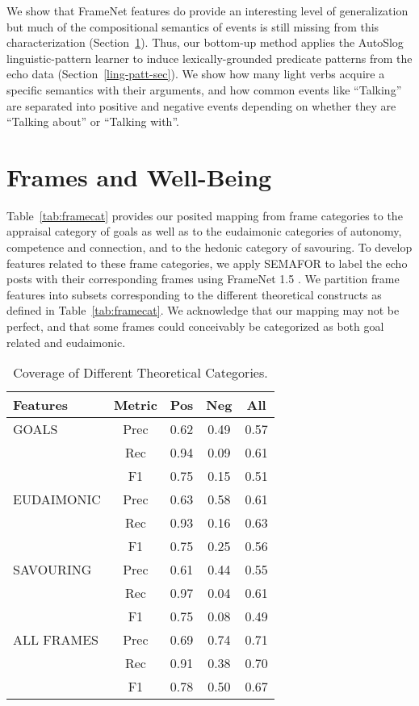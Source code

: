 \documentclass[11pt,letterpaper]{article}
\begin{document}
We show that FrameNet features do provide an interesting level of
generalization but much of the compositional semantics of events is
still missing from this characterization (Section~\ref{frame-sec}).  Thus, our bottom-up method
applies the AutoSlog linguistic-pattern learner to induce
lexically-grounded predicate patterns from the {\sc echo} data (Section~\ref{ling-patt-sec}).
We show how many light verbs acquire a specific semantics with their
arguments, and how common events like ``Talking'' are separated
into positive and negative events depending on whether they are
``Talking about'' or ``Talking with''.


\section{Frames and Well-Being}
\label{frame-sec}

Table~\ref{tab:framecat} provides our posited mapping from frame
categories to the appraisal category of {\sc goals}
as well as to the eudaimonic categories of {\sc autonomy}, {\sc
  competence} and {\sc connection}, and to the hedonic category of
{\sc savouring}.  To develop features related to these frame
categories, we apply SEMAFOR \cite{das2013:semafor} to label the {\sc
  echo} posts with their corresponding frames using FrameNet 1.5
\cite{Bakeretal15,Bakeretal14}. We partition frame features into
subsets corresponding to the different theoretical constructs
as defined in Table~\ref{tab:framecat}. We acknowledge that our
mapping may not be perfect, and that some frames could conceivably
be categorized as both goal related and eudaimonic.

\begin{table}[h!t]
\footnotesize
\centering
\begin{tabularx}{2.8in}{p{0.85in}| c| c c  c}
\toprule
\bf Features & \bf Metric & \bf Pos & \bf Neg & \bf All  \\
\midrule 
GOALS &  Prec &  0.62  & 0.49 &  0.57  \\
        &  Rec & 0.94 & 0.09  & 0.61 \\ 
        &  F1 &  0.75 & 0.15 & 0.51 \\
\midrule 
EUDAIMONIC &  Prec & 0.63 & 0.58 & 0.61  \\
     &  Rec & 0.93 & 0.16 & 0.63  \\
     &  F1 & 0.75 & 0.25 &  0.56 \\
\midrule 
SAVOURING &  Prec & 0.61 & 0.44 & 0.55  \\
     &  Rec & 0.97 & 0.04 & 0.61  \\
     &  F1 & 0.75 & 0.08 &  0.49 \\
\midrule
ALL FRAMES &  Prec &  0.69  & 0.74 &  0.71  \\
        &  Rec & 0.91 & 0.38  & 0.70 \\ 
        &  F1 &  0.78 & 0.50 & 0.67 \\
\bottomrule
\end{tabularx}
\caption{\label{tab:SVM-results} Coverage of Different Theoretical Categories. }
\end{table}  
\end{document}
